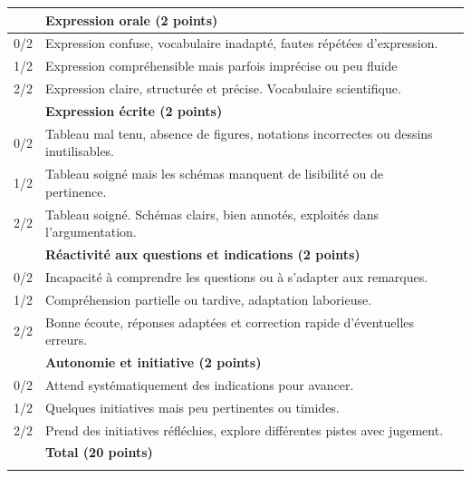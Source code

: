 \documentclass[a4paper,12pt,french]{article}
\begin{document}
\begin{scriptsize}
\begin{center}
\begin{tabular}{|p{}|p{}|p{}|}
	& \textbf{Expression orale (2 points)} & \\ \hline
	0/2 & Expression confuse, vocabulaire inadapté, fautes répétées d'expression. & \\ \hline
	1/2 & Expression compréhensible mais parfois imprécise ou peu fluide & \\ \hline
	2/2 & Expression claire, structurée et précise. Vocabulaire scientifique. & \\ \hline
	
	& \textbf{Expression écrite (2 points)} & \\ \hline
	0/2 & Tableau mal tenu, absence de figures, notations incorrectes ou dessins inutilisables. & \\ \hline
	1/2 & Tableau soigné mais les schémas manquent de lisibilité ou de pertinence. & \\ \hline
	2/2 & Tableau soigné. Schémas clairs, bien annotés, exploités dans l'argumentation. & \\ \hline
	
	& \textbf{Réactivité aux questions et indications (2 points)} & \\ \hline
	0/2 & Incapacité à comprendre les questions ou à s'adapter aux remarques. & \\ \hline
	1/2 & Compréhension partielle ou tardive, adaptation laborieuse. & \\ \hline
	2/2 & Bonne écoute, réponses adaptées et correction rapide d'éventuelles erreurs. & \\ \hline
	
	& \textbf{Autonomie et initiative (2 points)} & \\ \hline
	0/2 & Attend systématiquement des indications pour avancer. & \\ \hline
	1/2 & Quelques initiatives mais peu pertinentes ou timides. & \\ \hline
	2/2 & Prend des initiatives réfléchies, explore différentes pistes avec jugement. & \\ \hline
	
	& \textbf{Total (20 points)} & \\
	& & \\ \hline
\end{tabular} 
\end{center}
\end{scriptsize}
\end{document}
